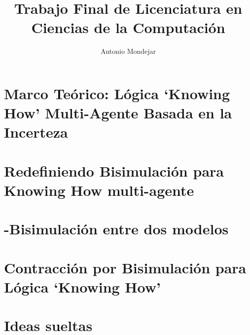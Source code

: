 \documentclass[a4paper,10pt]{article}
\begin{document}
\title{Trabajo Final de Licenciatura en Ciencias de la Computación}

\author{Antonio Mondejar}

\maketitle

\section{Marco Teórico: Lógica `Knowing How' Multi-Agente Basada en la Incerteza}
    

\section{Redefiniendo Bisimulación para Knowing How multi-agente}
    

\section{\KHilogic-Bisimulación entre dos modelos}
    
        
\section{Contracción por Bisimulación para Lógica `Knowing How'}
    

\section{Ideas sueltas}
    




\end{document}
